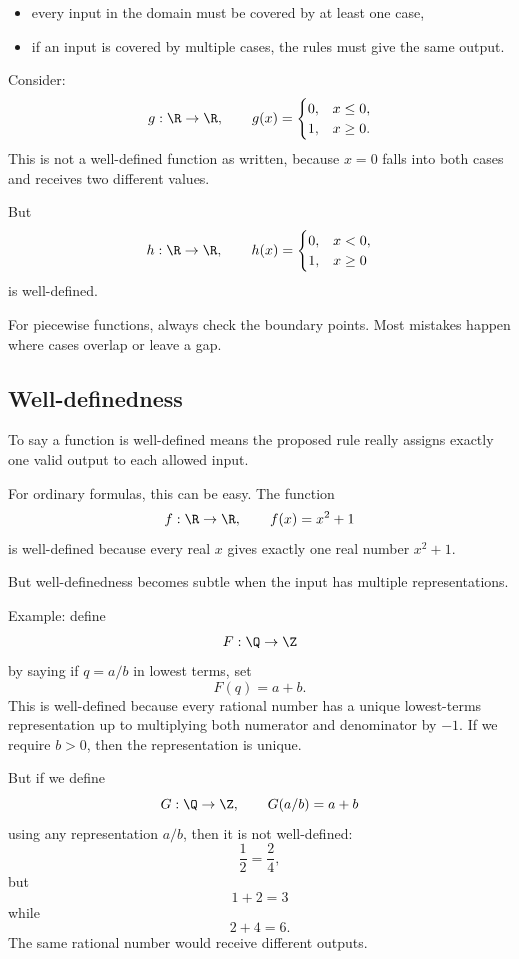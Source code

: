\begin{itemize}
\item every input in the domain must be covered by at least one case,
\item if an input is covered by multiple cases, the rules must give the same output.
\end{itemize}

Consider:
\[
g:\R\to\R,\qquad
g(x)=
\begin{cases}
0,&x\leq0,\\
1,&x\geq0.
\end{cases}
\]
This is not a well-defined function as written, because $x=0$ falls into both cases and receives two different values.

But
\[
h:\R\to\R,\qquad
h(x)=
\begin{cases}
0,&x<0,\\
1,&x\geq0
\end{cases}
\]
is well-defined.

\begin{trapbox}
For piecewise functions, always check the boundary points. Most mistakes happen where cases overlap or leave a gap.
\end{trapbox}

\subsection{Well-definedness}

To say a function is well-defined means the proposed rule really assigns exactly one valid output to each allowed input.

For ordinary formulas, this can be easy. The function
\[
f:\R\to\R,\qquad f(x)=x^2+1
\]
is well-defined because every real $x$ gives exactly one real number $x^2+1$.

But well-definedness becomes subtle when the input has multiple representations.

Example: define
\[
F:\Q\to\Z
\]
by saying if $q=a/b$ in lowest terms, set
\[
F(q)=a+b.
\]
This is well-defined because every rational number has a unique lowest-terms representation up to multiplying both numerator and denominator by $-1$. If we require $b>0$, then the representation is unique.

But if we define
\[
G:\Q\to\Z,\qquad G(a/b)=a+b
\]
using any representation $a/b$, then it is not well-defined:
\[
\frac12=\frac24,
\]
but
\[
1+2=3
\]
while
\[
2+4=6.
\]
The same rational number would receive different outputs.

